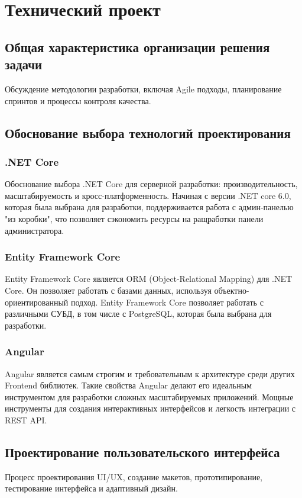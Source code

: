 \section{Технический проект}

\subsection{Общая характеристика организации решения задачи}
Обсуждение методологии разработки, включая Agile подходы, планирование спринтов и процессы контроля качества.

\subsection{Обоснование выбора технологий проектирования}
\subsubsection{.NET Core}
Обоснование выбора .NET Core для серверной разработки: производительность, масштабируемость и кросс-платформенность.
Начиная с версии .NET core 6.0, которая была выбрана для разработки, поддерживается работа с админ-панелью "из коробки", что позволяет сэкономить ресурсы на ращработки панели администратора.
\subsubsection{Entity Framework Core}
Entity Framework Core является ORM (Object-Relational Mapping) для .NET Core. Он позволяет работать с базами данных, используя объектно-ориентированный подход. Entity Framework Core позволяет работать с различными СУБД, в том числе с PostgreSQL, которая была выбрана для разработки.
\subsubsection{Angular}
Angular является самым строгим и требовательным к архитектуре среди других Frontend библиотек. Такие свойства Angular делают его идеальным инструментом для разработки сложных масштабируемых приложений. Мощные инструменты для создания интерактивных интерфейсов и легкость интеграции с REST API.

\subsection{Проектирование пользовательского интерфейса}
Процесс проектирования UI/UX, создание макетов, прототипирование, тестирование интерфейса и адаптивный дизайн.


